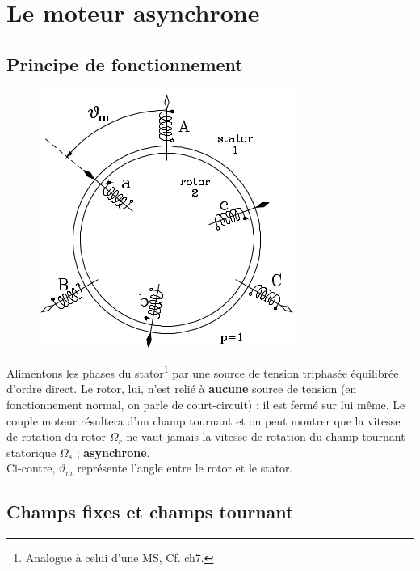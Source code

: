 \chapter{Le moteur asynchrone}
\section{Principe de fonctionnement}
	\begin{figure}
	\vspace{-5mm}
	\includegraphics[scale=0.34]{ch5/image1.png}
	\end{figure}
Alimentons les phases du stator\footnote{Analogue à celui d'une MS, Cf. ch7.} 
par une source de tension triphasée équilibrée d'ordre direct. Le rotor, lui, 
n'est relié à \textbf{aucune} source de tension (en fonctionnement normal, on 
parle de court-circuit) : il est fermé sur lui même. 
Le couple moteur résultera d'un champ tournant et on peut montrer que la vitesse 
de rotation du rotor $\Omega_r$ ne vaut jamais la vitesse de rotation du 
champ tournant statorique $\Omega_s$ ; \textbf{asynchrone}.\\

Ci-contre, $\vartheta_m$ représente l'angle entre le rotor et le stator. 


\section{Champs fixes et champs tournant}
